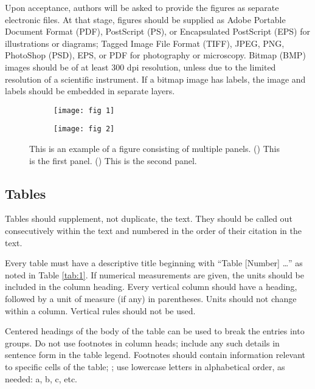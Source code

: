 \documentclass{article}
\begin{document}
Upon acceptance, authors will be asked to provide the figures as separate electronic files. At that stage, figures should be supplied as Adobe Portable Document Format (PDF), PostScript (PS), or Encapsulated PostScript (EPS) for illustrations or diagrams; Tagged Image File Format (TIFF), JPEG, PNG, PhotoShop (PSD), EPS, or PDF for photography or microscopy. Bitmap (BMP) images should be of at least 300 dpi resolution, unless due to the limited resolution of a scientific instrument. If a bitmap image has labels, the image and labels should be embedded in separate layers.
\begin{figure}[h]
    \centering
    \begin{subfigure}{0.4\textwidth}
        \texttt{[image: fig 1]}
        \caption\protect{\label{fig:2a}}
    \end{subfigure}
    \begin{subfigure}{0.4\textwidth}
        \texttt{[image: fig 2]}
        \caption\protect{\label{fig:2b}}
    \end{subfigure}
    \caption{This is an example of a figure consisting of multiple panels.     () This is the first panel. () This is the second panel.}
    \label{fig:2}
\end{figure}

\subsection*{Tables}
Tables should supplement, not duplicate, the text. They should be called out consecutively within the text and numbered in the order of their citation in the text. 

Every table must have a descriptive title beginning with ``Table [Number] …'' as noted in Table \ref{tab:1}. If numerical measurements are given, the units should be included in the column heading. Every vertical column should have a heading, followed by a unit of measure (if any) in parentheses. Units should not change within a column. Vertical rules should not be used. 

Centered headings of the body of the table can be used to break the entries into groups. Do not use footnotes in column heads; include any such details in sentence form in the table legend. Footnotes should contain information relevant to specific cells of the table; ; use lowercase letters in alphabetical order, as needed: a, b, c, etc.
\end{document}
